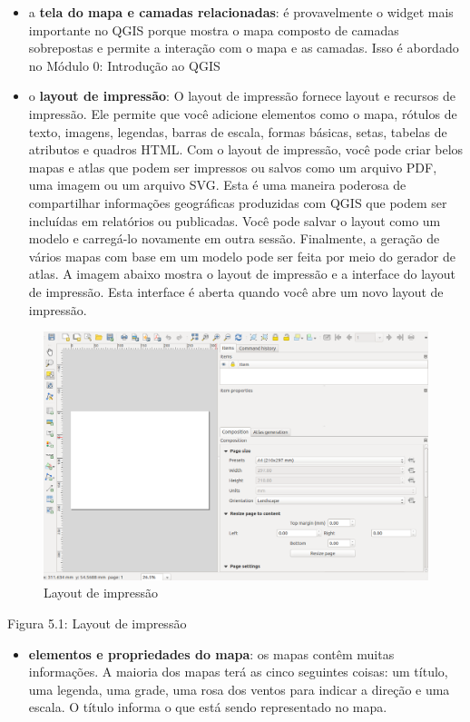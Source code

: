 \documentclass[
  portuguese,
]{krantz}
\providecommand{\tightlist}{%
  \setlength{\itemsep}{0pt}\setlength{\parskip}{0pt}}
\begin{document}
\begin{itemize}
\tightlist
\item
  a \textbf{tela do mapa e camadas relacionadas}: é provavelmente o widget mais importante no QGIS porque mostra o mapa composto de camadas sobrepostas e permite a interação com o mapa e as camadas. Isso é abordado no Módulo 0: Introdução ao QGIS
\item
  o \textbf{layout de impressão}: O layout de impressão fornece layout e recursos de impressão. Ele permite que você adicione elementos como o mapa, rótulos de texto, imagens, legendas, barras de escala, formas básicas, setas, tabelas de atributos e quadros HTML. Com o layout de impressão, você pode criar belos mapas e atlas que podem ser impressos ou salvos como um arquivo PDF, uma imagem ou um arquivo SVG. Esta é uma maneira poderosa de compartilhar informações geográficas produzidas com QGIS que podem ser incluídas em relatórios ou publicadas. Você pode salvar o layout como um modelo e carregá-lo novamente em outra sessão. Finalmente, a geração de vários mapas com base em um modelo pode ser feita por meio do gerador de atlas. A imagem abaixo mostra o layout de impressão e a interface do layout de impressão. Esta interface é aberta quando você abre um novo layout de impressão.
\end{itemize}

\begin{figure}
\centering
\includegraphics{media/modulo5/print_comp2.png}
\caption{Layout de impressão}
\end{figure}

Figura 5.1: Layout de impressão

\begin{itemize}
\tightlist
\item
  \textbf{elementos e propriedades do mapa}: os mapas contêm muitas informações. A maioria dos mapas terá as cinco seguintes coisas: um título, uma legenda, uma grade, uma rosa dos ventos para indicar a direção e uma escala. O título informa o que está sendo representado no mapa.
\end{itemize}
\end{document}
